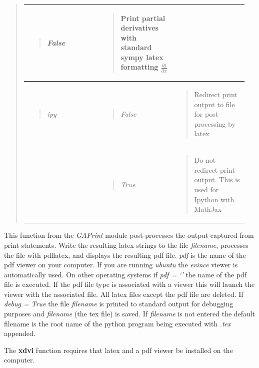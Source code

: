 \documentclass[letterpaper,10pt,english]{sphinxmanual}
\begin{document}
\begin{fulllineitems}
\begin{quote}
\begin{tabular}{|p{0.317\linewidth}|p{0.317\linewidth}|p{0.317\linewidth}|}
\begin{quote}
\emph{False}
\end{quote}
 & \begin{quote}

Print partial derivatives with standard sympy latex formatting $\frac{\partial f}{\partial x}$
\end{quote}
\\\hline
\begin{quote}

\emph{ipy}
\end{quote}
 & \begin{quote}

\emph{False}
\end{quote}
 & \begin{quote}

Redirect print output to file for post-processing by latex
\end{quote}
\\\hline
 & \begin{quote}

\emph{True}
\end{quote}
 & \begin{quote}

Do not redirect print output.  This is used for Ipython with MathJax
\end{quote}
\\\hline
\end{tabular}

\end{quote}

\end{fulllineitems}


\begin{fulllineitems}
\label{GA:xdvi}
This function from the \emph{GAPrint} module post-processes the output captured from
print statements.  Write the resulting latex strings to the file \emph{filename},
processes the file with pdflatex, and displays the resulting pdf file. \emph{pdf} is the name of the
pdf viewer on your computer.  If you are running \emph{ubuntu} the \emph{evince} viewer is automatically
used.  On other operating systems if \emph{pdf = `'} the name of the pdf file is executed.  If the
pdf file type is associated with a viewer this will launch the viewer with the associated file.
All latex files except
the pdf file are deleted. If \emph{debug = True} the file \emph{filename} is printed to
standard output for debugging purposes and \emph{filename} (the tex file) is saved.  If \emph{filename} is not entered the default
filename is the root name of the python program being executed with \emph{.tex} appended.

The \textbf{xdvi} function requires that latex and a pdf viewer be installed on
the computer.

\end{fulllineitems}
\end{document}
